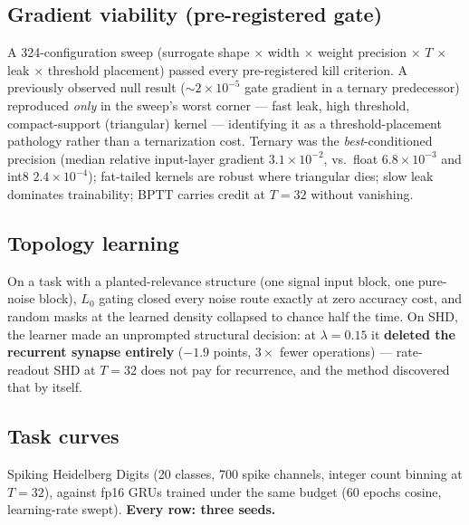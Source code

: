 \documentclass[11pt]{article}
\begin{document}
\subsection{Gradient viability (pre-registered gate)}

A 324-configuration sweep (surrogate shape $\times$ width $\times$ weight
precision $\times$ $T$ $\times$ leak $\times$ threshold placement) passed
every pre-registered kill criterion. A previously observed null result
(${\sim}2\times10^{-5}$ gate gradient in a ternary predecessor) reproduced
\emph{only} in the sweep's worst corner --- fast leak, high threshold,
compact-support (triangular) kernel --- identifying it as a
threshold-placement pathology rather than a ternarization cost. Ternary was
the \emph{best}-conditioned precision (median relative input-layer gradient
$3.1\times10^{-2}$, vs.\ float $6.8\times10^{-3}$ and int8
$2.4\times10^{-4}$); fat-tailed kernels are robust where triangular dies;
slow leak dominates trainability; BPTT carries credit at $T{=}32$ without
vanishing.

\subsection{Topology learning}

On a task with a planted-relevance structure (one signal input block, one
pure-noise block), $L_0$ gating closed every noise route exactly at zero
accuracy cost, and random masks at the learned density collapsed to chance
half the time. On SHD, the learner made an unprompted structural decision:
at $\lambda = 0.15$ it \textbf{deleted the recurrent synapse entirely}
($-1.9$ points, $3\times$ fewer operations) --- rate-readout SHD at $T{=}32$
does not pay for recurrence, and the method discovered that by itself.

\subsection{Task curves}

Spiking Heidelberg Digits \cite{cramer2020heidelberg} (20 classes, 700 spike
channels, integer count binning at $T{=}32$), against fp16 GRUs trained under
the same budget (60 epochs cosine, learning-rate swept). \textbf{Every row:
three seeds.}
\end{document}
